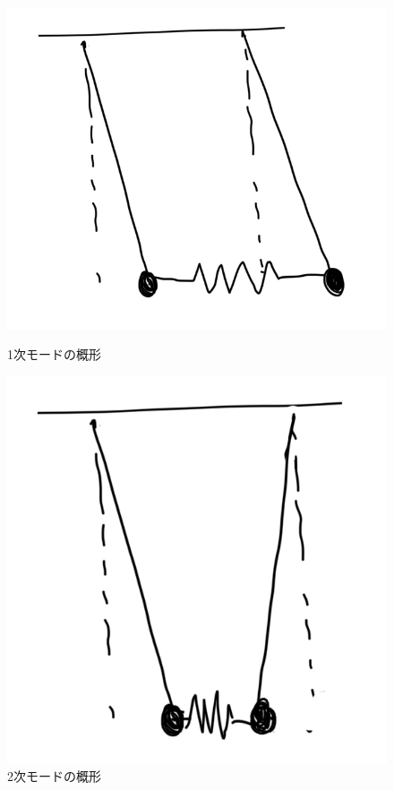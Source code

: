 \documentclass[a4paper]{jsarticle}
\begin{document}
\begin{figure}[htb]
  \begin{minipage}{0.5\hsize}
    \centering
    \includegraphics[width=0.5\hsize]{fig1.png}
    \caption{1次モードの概形}
  \end{minipage}
  \begin{minipage}{0.5\hsize}
    \centering
    \includegraphics[width=0.5\hsize]{fig2.png}
    \caption{2次モードの概形}
  \end{minipage}
\end{figure}
\end{document}
